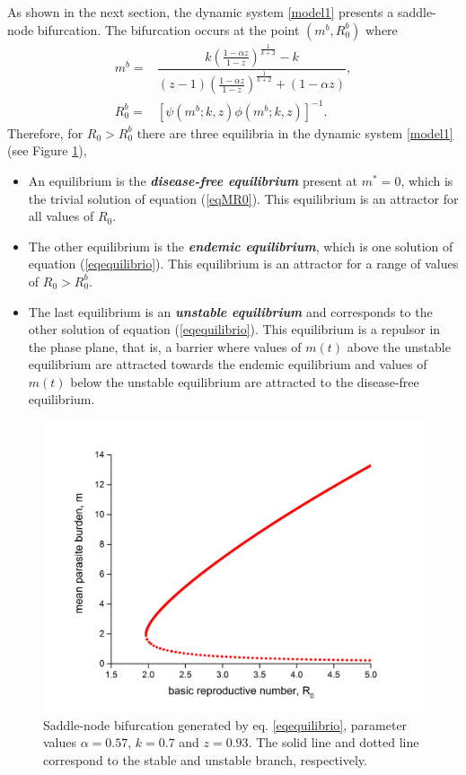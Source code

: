 \documentclass[eng]{MMSB-class-eng}
\begin{document}
{As shown in the next section,  the dynamic system \eqref{model1} presents a saddle-node bifurcation.
The bifurcation occurs at the point $(m^b, R_0^b)$ where
\begin{equation}\label{meq}
\begin{split}
m^b=&\dfrac{k\left( \frac{1-\alpha z}{1-z}\right)^{\frac{1}{k+2}} - k}{(z-1)\left( \frac{1-\alpha z}{1-z}\right)^{\frac{1}{k+2}} + (1-\alpha z)},\\ R_0^b=&\left[ \psi(m^b;k,z)\phi(m^b;k,z)\right]^{-1}.
\end{split}	
\end{equation}
Therefore, for $R_0 > R_0^b$ there are three equilibria in the dynamic system \eqref{model1} (see Figure \ref{f:phase}),

\begin{itemize}
	\item An equilibrium is the \textit{\textbf{disease-free equilibrium}} present at $m^*= 0$, which is the trivial solution of equation (\ref{eqMR0}). 
	This equilibrium is an attractor for all values of $R_0$.
	
	\item The other equilibrium
	is the \textit{\textbf{endemic equilibrium}}, which is one solution of equation (\ref{eqequilibrio}).
	This equilibrium is an attractor for a range of values of $R_0> R_0^b $.
	
	\item The last equilibrium is an \textit{\textbf{unstable equilibrium}} and corresponds to the other solution of equation (\ref{eqequilibrio}).
	This equilibrium is a repulsor in the phase plane, that is, a barrier where values of $m(t)$ above the unstable equilibrium are attracted towards the endemic equilibrium and values of $m(t)$ below the unstable equilibrium are attracted to the disease-free equilibrium.

\end{itemize}
\begin{figure}[h!]
	\centering
	\includegraphics[width=0.99\linewidth]{bifurcation}
	\caption{Saddle-node bifurcation generated by eq. \eqref{eqequilibrio}, parameter values $\alpha=0.57$, $k=0.7$ and $z=0.93$.
	The solid line and dotted line correspond to the stable and unstable branch, respectively.}
	\label{f:phase}
\end{figure}

}
\end{document}
